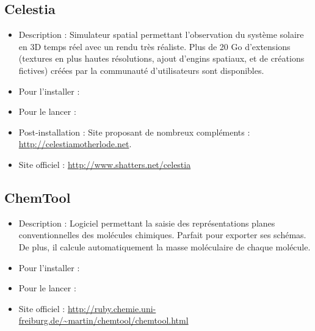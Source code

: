 \subsection{Celestia}
\begin{itemize}
\begingroup
{}
\item Description : Simulateur spatial permettant l'observation du système solaire en 3D temps réel avec un rendu très réaliste. Plus de 20 Go d'extensions (textures en plus hautes résolutions, ajout d'engins spatiaux, et de créations fictives) créées par la communauté d'utilisateurs sont disponibles.{\par}
\endgroup
\item Pour l'installer : 
\item Pour le lancer : 
\item Post-installation : Site proposant de nombreux  compléments : \url{http://celestiamotherlode.net}.{\par}
\item Site officiel : \url{http://www.shatters.net/celestia}{\par}
\end{itemize}
\subsection{ChemTool}
\begin{itemize}
\begingroup
{}
\item Description : Logiciel permettant la saisie des représentations planes conventionnelles des molécules chimiques. Parfait pour exporter ses schémas. De plus, il calcule automatiquement la masse moléculaire de chaque molécule.{\par}
\item Pour l'installer : 
\item Pour le lancer : 
\item Site officiel : \url{http://ruby.chemie.uni-freiburg.de/~martin/chemtool/chemtool.html}{\par}
\endgroup
\end{itemize}
\newpage
